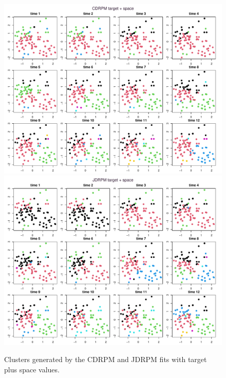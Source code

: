 \documentclass[12pt,	%
	a4paper,		%
	twoside,		%
	openright,		%
	titlepage,%
	]{book}
\theoremstyle{definition}
\begin{document}
\begin{figure}[!p]
    \centering
    \includegraphics[width=1\linewidth]{Testing/Assessing correctness/simple maps/fitCDRPM target + space_simple_map.pdf}
    \includegraphics[width=1\linewidth]{Testing/Assessing correctness/simple maps/fitJDRPM target + space_simple_map.pdf}
    \caption[Clusters generated by CDRPM and JDRPM fits, target plus space values]{Clusters generated by the CDRPM and JDRPM fits with target plus space values.}
    \label{fig:clusters space basic simple}
\end{figure}

\end{document}
